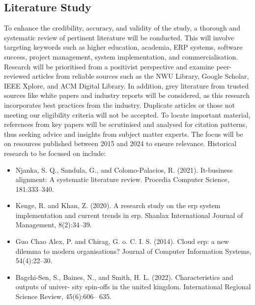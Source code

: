 \subsection{Literature Study}
\par{To enhance the credibility, accuracy, and validity of the study, a thorough and systematic review of pertinent literature will be conducted. This will involve targeting keywords such as higher education, academia, ERP systems, software success, project management, system implementation, and commercialisation. Research will be prioritised from a positivist perspective and examine peer-reviewed articles from reliable sources such as the NWU Library, Google Scholar, IEEE Xplore, and ACM Digital Library. In addition, grey literature from trusted sources like white papers and industry reports will be considered, as this research incorporates best practices from the industry. Duplicate articles or those not meeting our eligibility criteria will not be accepted. To locate important material, references from key papers will be scrutinised and analysed for citation patterns, thus seeking advice and insights from
subject matter experts. The focus will be on resources published between 2015 and 2024 to ensure relevance. Historical research to be focused on include:}
\par{\begin{itemize}
    \item Njanka, S. Q., Sandula, G., and Colomo-Palacios, R. (2021). It-business alignment: A
systematic literature review. Procedia Computer Science, 181:333–340.
    \item Kenge, R. and Khan, Z. (2020). A research study on the erp system implementation and
current trends in erp. Shanlax International Journal of Management, 8(2):34–39.
    \item Guo Chao Alex, P. and Chirag, G. o. C. I. S. (2014). Cloud erp: a new dilemma to modern
organisations? Journal of Computer Information Systems, 54(4):22–30.
    \item Bagchi-Sen, S., Baines, N., and Smith, H. L. (2022). Characteristics and outputs of univer-
sity spin-offs in the united kingdom. International Regional Science Review, 45(6):606–
635.
\end{itemize}}
